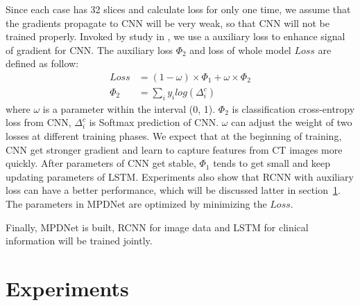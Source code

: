 \documentclass[journal]{IEEEtran}
\begin{document}
Since each case has 32 slices and calculate loss for only one time, we assume that the gradients propagate to CNN will be very weak, so that CNN will not be trained properly. Invoked by study in \cite{szegedy2016rethinking}, we use a auxiliary loss to enhance signal of gradient for CNN.
The auxiliary loss $\Phi_2$ and loss of whole model $Loss$ are defined as follow: 
\begin{align*}
Loss &=  (1 - \omega) \times \Phi_1 +  \omega \times \Phi_2 \\
\Phi_2 &= \sum_i{y_i log(\Delta^c_i)}
\end{align*}
where $\omega$ is a parameter within the interval (0, 1). $\Phi_2$ is classification cross-entropy loss from CNN, $\Delta^c_i$ is Softmax prediction of CNN. $\omega$ can adjust the weight of two losses at different training phases.
We expect that at the beginning of training, CNN get stronger gradient and learn to capture features from CT images more quickly. After parameters of CNN get stable, $\Phi_1$ tends to get small and keep updating parameters of LSTM. Experiments also show that RCNN with auxiliary loss can have a better performance, which will be discussed latter in section~\ref{experiments}. The parameters in MPDNet are optimized by minimizing the $Loss$.

Finally, MPDNet is built, RCNN for image data and LSTM for clinical information will be trained jointly.


\section{Experiments}
\label{experiments}
\end{document}
